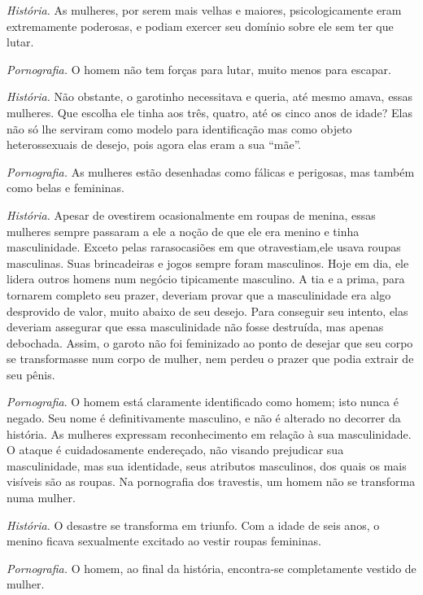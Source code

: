 \textit{História.} As mulheres, por serem mais velhas e maiores,
psicologicamente eram extremamente poderosas, e podiam exercer seu
domínio sobre ele sem ter que lutar.

\textit{Pornografia.} O homem não tem forças para lutar, muito menos
para escapar.




\textit{História.} Não obstante, o garotinho necessitava e queria,
até mesmo amava, essas mulheres. Que escolha ele tinha aos três,
quatro, até os cinco anos de idade? Elas não só lhe serviram como
modelo para identificação mas como objeto heterossexuais de desejo,
pois agora elas eram a sua ``mãe''.

\textit{Pornografia.} As mulheres estão desenhadas como fálicas\idxmulhf{} e
perigosas, mas também como belas e femininas.




\textit{História.} Apesar de o\idxtravempape[|(] vestirem ocasionalmente em roupas de
menina, essas mulheres sempre passaram a ele a noção de que ele era
menino e tinha masculinidade.\idxmascuhum{} Exceto pelas raras\idxtraumatrae[|(] ocasiões em que o\idxtraumatrav[|(]
travestiam,\idxtravetrau[|(] ele usava roupas masculinas. Suas brincadeiras e jogos
sempre foram masculinos. Hoje em dia, ele lidera outros homens num
negócio tipicamente masculino. A tia e a prima, para tornarem completo
seu prazer, deveriam provar que a masculinidade era algo desprovido de
valor, muito abaixo de seu desejo. Para conseguir seu intento, elas
deveriam assegurar que essa masculinidade não fosse destruída, mas
apenas debochada. Assim, o garoto não foi feminizado ao ponto de
desejar que seu corpo se transformasse num corpo de mulher, nem perdeu
o prazer que podia extrair de seu pênis.

\textit{Pornografia}. O homem está claramente identificado como
homem; isto nunca é negado. Seu nome é definitivamente masculino, e não
é alterado no decorrer da história. As mulheres expressam
reconhecimento em relação à sua masculinidade. O ataque é
cuidadosamente endereçado, não visando prejudicar sua masculinidade,
mas sua identidade, seus atributos masculinos, dos quais os mais
visíveis são as roupas. Na pornografia dos travestis, um homem não se
transforma numa mulher.


\textit{História.} O desastre se transforma em triunfo. Com a idade
de seis anos, o menino ficava sexualmente excitado ao vestir roupas
femininas.

\textit{Pornografia.} O homem, ao final da história, encontra-se
completamente vestido de mulher.



